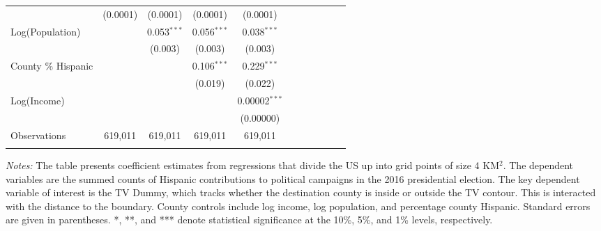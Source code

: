 \begin{table}[!h]
{\begin{threeparttable}
\begin{tabular}{lcccccccccc}
  & (0.0001) & (0.0001) & (0.0001) & (0.0001) \\ 
 Log(Population) &  & 0.053$^{***}$ & 0.056$^{***}$ & 0.038$^{***}$ \\ 
  &  & (0.003) & (0.003) & (0.003) \\ 
 County \% Hispanic &  &  & 0.106$^{***}$ & 0.229$^{***}$ \\ 
  &  &  & (0.019) & (0.022) \\ 
 Log(Income) &  &  &  & 0.00002$^{***}$ \\ 
  &  &  &  & (0.00000) \\ 
Observations & 619,011 & 619,011 & 619,011 & 619,011 \\ 
				\addlinespace\hline\hline
			\end{tabular}
			\begin{tablenotes}[flushleft]
				\item \textit{Notes:} The table presents coefficient estimates from regressions that divide the US up into grid points of size 4 KM$^2$. The dependent variables are the summed counts of Hispanic contributions to political campaigns in the 2016 presidential election. The key dependent variable of interest is the TV Dummy, which tracks whether the destination county is inside or outside the TV contour. This is interacted with the distance to the boundary. County controls include log income, log population, and percentage county Hispanic. Standard errors are given in parentheses. *, **, and *** denote statistical significance at the 10\%, 5\%, and 1\% levels, respectively.
			\end{tablenotes}
		\end{threeparttable}
	}
\end{table}